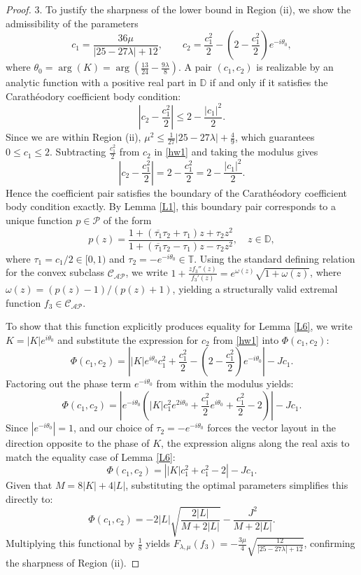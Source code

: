 \documentclass[11pt]{article}
\newcommand{\ol}{\overline}
\numberwithin{equation}{section}
\begin{document}
\begin{proof}
3. To justify the sharpness of the lower bound in Region (ii), we show the admissibility of the parameters
\begin{equation}\label{hw1}
c_1 = \frac{36\mu}{|25-27\lambda|+12}, \qquad c_2 = \frac{c_1^2}{2} - \left(2 - \frac{c_1^2}{2}\right)e^{-i\theta_0},
\end{equation}
where $\theta_0 = \arg(K) = \arg\left(\frac{13}{24} - \frac{9\lambda}{8}\right)$. A pair $(c_1, c_2)$ is realizable by an analytic function with a positive real part in $\mathbb{D}$ if and only if it satisfies the Carath\'{e}odory coefficient body condition:
\begin{equation}\label{hw2}
\left| c_2 - \frac{c_1^2}{2} \right| \le 2 - \frac{|c_1|^2}{2}.
\end{equation}
Since we are within Region (ii), $\mu^2 \le \frac{1}{27} |25 - 27\lambda| + \frac{4}{9}$, which guarantees $0 \le c_1 \le 2$. Subtracting $\frac{c_1^2}{2}$ from $c_2$ in \eqref{hw1} and taking the modulus gives
\[
\left| c_2 - \frac{c_1^2}{2} \right| = 2 - \frac{c_1^2}{2} = 2 - \frac{|c_1|^2}{2}.
\]
Hence the coefficient pair satisfies the boundary of the Carath\'{e}odory coefficient body condition exactly. By Lemma \ref{L1}, this boundary pair corresponds to a unique function $p \in \mathcal{P}$ of the form
\[
p(z) = \frac{1 + (\ol{\tau_1}\tau_2 + \tau_1)z + \tau_2 z^2}{1 + (\ol{\tau_1}\tau_2 - \tau_1)z - \tau_2 z^2}, \quad z\in\mathbb{D},
\]
where $\tau_1 = c_1/2 \in [0,1)$ and $\tau_2 = -e^{-i\theta_0} \in \mathbb{T}$. Using the standard defining relation for the convex subclass $\mathcal{C}_{\mathcal{AP}}$, we write $1 + \frac{z f_3''(z)}{f_3'(z)} = e^{\omega(z)}\sqrt{1+\omega(z)}$, where $\omega(z) = (p(z)-1)/(p(z)+1)$, yielding a structurally valid extremal function $f_3 \in \mathcal{C}_{\mathcal{AP}}$.

To show that this function explicitly produces equality for Lemma \ref{L6}, we write $K = |K|e^{i\theta_0}$ and substitute the expression for $c_2$ from \eqref{hw1} into $\Phi(c_1,c_2)$:
\[
\Phi(c_1,c_2) = \left| |K|e^{i\theta_0}c_1^2 + \frac{c_1^2}{2} - \left(2 - \frac{c_1^2}{2}\right)e^{-i\theta_0} \right| - J c_1.
\]
Factoring out the phase term $e^{-i\theta_0}$ from within the modulus yields:
\[
\Phi(c_1,c_2) = \left| e^{-i\theta_0} \left( |K|c_1^2 e^{2i\theta_0} + \frac{c_1^2}{2}e^{i\theta_0} + \frac{c_1^2}{2} - 2 \right) \right| - J c_1.
\]
Since $|e^{-i\theta_0}| = 1$, and our choice of $\tau_2 = -e^{-i\theta_0}$ forces the vector layout in the direction opposite to the phase of $K$, the expression aligns along the real axis to match the equality case of Lemma \ref{L6}:
\[
\Phi(c_1,c_2) = \left| |K|c_1^2 + c_1^2 - 2 \right| - J c_1.
\]
Given that $M = 8|K| + 4|L|$, substituting the optimal parameters simplifies this directly to:
\[
\Phi(c_1,c_2) = -2|L| \sqrt{\frac{2|L|}{M+2|L|}} - \frac{J^2}{M+2|L|}.
\]
Multiplying this functional by $\frac{1}{8}$ yields $F_{\lambda,\mu}(f_3) = -\frac{3\mu}{4} \sqrt{ \frac{12}{|25 - 27\lambda| + 12} }$, confirming the sharpness of Region (ii).
\end{proof}
\end{document}
